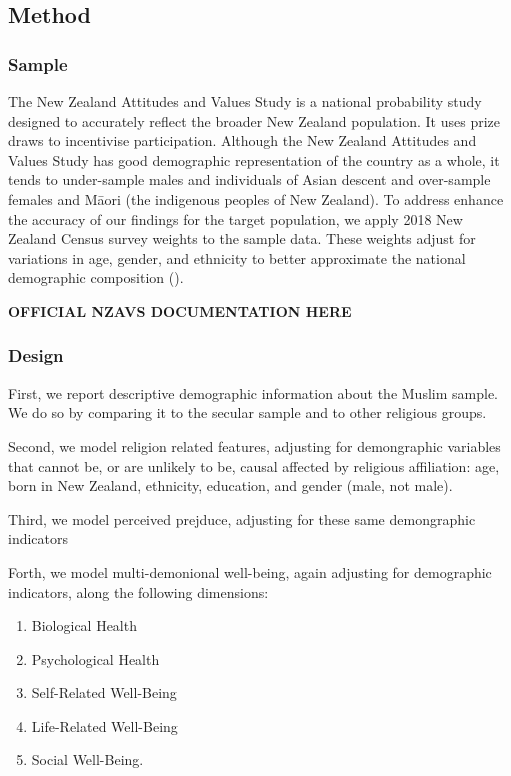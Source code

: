 \documentclass[
  single column]{article}
\providecommand{\tightlist}{%
  \setlength{\itemsep}{0pt}\setlength{\parskip}{0pt}}\usepackage{longtable,booktabs,array}
\begin{document}
\subsection{Method}\label{method}

\newpage{}

\subsubsection{Sample}\label{sample}

The New Zealand Attitudes and Values Study is a national probability
study designed to accurately reflect the broader New Zealand population.
It uses prize draws to incentivise participation. Although the New
Zealand Attitudes and Values Study has good demographic representation
of the country as a whole, it tends to under-sample males and
individuals of Asian descent and over-sample females and Māori (the
indigenous peoples of New Zealand). To address enhance the accuracy of
our findings for the target population, we apply 2018 New Zealand Census
survey weights to the sample data. These weights adjust for variations
in age, gender, and ethnicity to better approximate the national
demographic composition ().

\textbf{OFFICIAL NZAVS DOCUMENTATION HERE}

\subsubsection{Design}\label{design}

First, we report descriptive demographic information about the Muslim
sample. We do so by comparing it to the secular sample and to other
religious groups.

Second, we model religion related features, adjusting for demongraphic
variables that cannot be, or are unlikely to be, causal affected by
religious affiliation: age, born in New Zealand, ethnicity, education,
and gender (male, not male).

Third, we model perceived prejduce, adjusting for these same
demongraphic indicators

Forth, we model multi-demonional well-being, again adjusting for
demographic indicators, along the following dimensions:

\begin{enumerate}
\def\labelenumi{\alph{enumi}.}
\tightlist
\item
  Biological Health
\item
  Psychological Health
\item
  Self-Related Well-Being
\item
  Life-Related Well-Being
\item
  Social Well-Being.
\end{enumerate}
\end{document}
